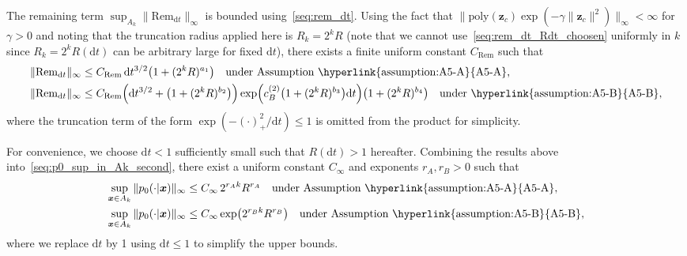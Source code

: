 \documentclass[
 longbibliography,
 twocolumn,
 superscriptaddress,
 amsmath,
 amssymb,
 amsthm,
 amsfonts,
 prl,
 floatfix,
]{revtex4-2}
\begin{document}
\begin{widetext}
The remaining term $\sup_{A_k}\|\mathrm{Rem}_{\mathrm dt}\|_\infty$ is bounded using~\eqref{seq:rem_dt}. Using the fact that $\|\text{poly}(\bm z_c)\exp(-\gamma\|\bm z_c\|^2)\|_\infty<\infty$ for $\gamma>0$ and noting that the truncation radius applied here is $R_k=2^kR$ (note that we cannot use~\eqref{seq:rem_dt_Rdt_choosen} uniformly in $k$ since $R_k=2^kR(\mathrm dt)$ can be arbitrary large for fixed $\mathrm dt$), there exists a finite uniform constant $C_{\mathrm{Rem}}$ such that
\begin{subequations}\label{seq:rem_dt_bound_Ak}
\renewcommand{\theequation}{\theparentequation-\Alph{equation}}
\begin{align}
  \|\mathrm{Rem}_{\mathrm dt}\|_\infty&
  \leq C_{\mathrm{Rem}}\,\mathrm dt^{3/2}
  \big(1+(2^kR)^{a_1}\big)
  \quad\text{under Assumption~\hyperlink{assumption:A5-A}{A5-A}}
  \label{seq:rem_dt_A_Ak},
  \\
  \|\mathrm{Rem}_{\mathrm dt}\|_\infty
  &\leq C_{\mathrm{Rem}}
  \Big(\mathrm dt^{3/2}+\big(1+(2^kR)^{b_2}\big)\Big)
  \exp\!\Big(c_B^{(2)}\big(1+(2^kR)^{b_3}\big)\mathrm dt\Big)
  \big(1+(2^kR)^{b_4}\big)
  \quad\text{under~\hyperlink{assumption:A5-B}{A5-B}},
  \label{seq:rem_dt_B_Ak}
\end{align}
\end{subequations}
where the truncation term of the form $\exp(-(\cdot)_+^2/\mathrm dt)\leq1$ is omitted from the product for simplicity.

For convenience, we choose $\mathrm dt<1$ sufficiently small such that $R(\mathrm dt)>1$ hereafter. Combining the results above into~\eqref{seq:p0_sup_in_Ak_second}, there exist a uniform constant $C_\infty$ and exponents $r_A, r_B > 0$ such that
\begin{subequations}\label{seq:p0_sup_in_Ak_simple}
\renewcommand{\theequation}{\theparentequation-\Alph{equation}}
\begin{align}
    \sup_{\bm x\in A_k}
    \|p_0(\cdot|\bm x)\|_\infty
    &\leq
    C_\infty\,2^{r_A k}R^{r_A}
    \quad\text{under Assumption~\hyperlink{assumption:A5-A}{A5-A}}
    \label{seq:p0_sup_in_Ak_simple_A},
    \\
    \sup_{\bm x\in A_k}
    \|p_0(\cdot|\bm x)\|_\infty
    &\leq
    C_\infty\exp\!\big(2^{r_Bk}R^{r_B}\big)
    \quad\text{under Assumption~\hyperlink{assumption:A5-B}{A5-B}},
  \label{seq:p0_sup_in_Ak_simple_B}
\end{align}
\end{subequations}
where we replace $\mathrm dt$ by 1 using $\mathrm dt\leq 1$ to simplify the upper bounds.


\end{widetext}
\end{document}
